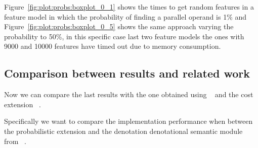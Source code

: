 Figure~\ref{fig:plot:probs:boxplot_0_1} shows
the times to get random features in a feature model
in which the probability of finding a parallel operand is
1\% and Figure~\ref{fig:plot:probs:boxplot_0_5}
shows the same approach varying the probability to
50\%, in this specific case last two feature models
the ones with 9000 and 10000 features have timed out 
due to memory consumption.


\subsection{Comparison between results and related work}
\label{sec:stat:impl:comp}


Now we can compare the last results with the one obtained using \fodaPA~\cite{acl13}
and the cost extension \fodaPAc~\cite{clc16}.


Specifically we want to compare the implementation performance when
between the probabilistic extension and the denotation denotational semantic module
from \fodaPA~\cite{acl13}.

